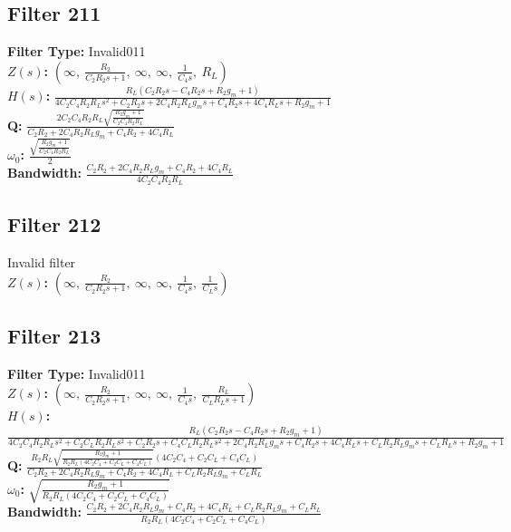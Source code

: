 \documentclass{article}
\begin{document}
\subsection*{Filter 211}
\textbf{Filter Type:} Invalid011 \\ 
\textbf{$Z(s)$:} $\left( \infty, \  \frac{R_{2}}{C_{2} R_{2} s + 1}, \  \infty, \  \infty, \  \frac{1}{C_{4} s}, \  R_{L}\right)$ \\ 
\textbf{$H(s)$:} $\frac{R_{L} \left(C_{2} R_{2} s - C_{4} R_{2} s + R_{2} g_{m} + 1\right)}{4 C_{2} C_{4} R_{2} R_{L} s^{2} + C_{2} R_{2} s + 2 C_{4} R_{2} R_{L} g_{m} s + C_{4} R_{2} s + 4 C_{4} R_{L} s + R_{2} g_{m} + 1}$ \\ 
\textbf{Q:} $\frac{2 C_{2} C_{4} R_{2} R_{L} \sqrt{\frac{R_{2} g_{m} + 1}{C_{2} C_{4} R_{2} R_{L}}}}{C_{2} R_{2} + 2 C_{4} R_{2} R_{L} g_{m} + C_{4} R_{2} + 4 C_{4} R_{L}}$ \\ 
\textbf{$\omega_0$:} $\frac{\sqrt{\frac{R_{2} g_{m} + 1}{C_{2} C_{4} R_{2} R_{L}}}}{2}$ \\ 
\textbf{Bandwidth:} $\frac{C_{2} R_{2} + 2 C_{4} R_{2} R_{L} g_{m} + C_{4} R_{2} + 4 C_{4} R_{L}}{4 C_{2} C_{4} R_{2} R_{L}}$ \\ 
\subsection*{Filter 212}
Invalid filter \\ 
\textbf{$Z(s)$:} $\left( \infty, \  \frac{R_{2}}{C_{2} R_{2} s + 1}, \  \infty, \  \infty, \  \frac{1}{C_{4} s}, \  \frac{1}{C_{L} s}\right)$ \\ 
\subsection*{Filter 213}
\textbf{Filter Type:} Invalid011 \\ 
\textbf{$Z(s)$:} $\left( \infty, \  \frac{R_{2}}{C_{2} R_{2} s + 1}, \  \infty, \  \infty, \  \frac{1}{C_{4} s}, \  \frac{R_{L}}{C_{L} R_{L} s + 1}\right)$ \\ 
\textbf{$H(s)$:} $\frac{R_{L} \left(C_{2} R_{2} s - C_{4} R_{2} s + R_{2} g_{m} + 1\right)}{4 C_{2} C_{4} R_{2} R_{L} s^{2} + C_{2} C_{L} R_{2} R_{L} s^{2} + C_{2} R_{2} s + C_{4} C_{L} R_{2} R_{L} s^{2} + 2 C_{4} R_{2} R_{L} g_{m} s + C_{4} R_{2} s + 4 C_{4} R_{L} s + C_{L} R_{2} R_{L} g_{m} s + C_{L} R_{L} s + R_{2} g_{m} + 1}$ \\ 
\textbf{Q:} $\frac{R_{2} R_{L} \sqrt{\frac{R_{2} g_{m} + 1}{R_{2} R_{L} \left(4 C_{2} C_{4} + C_{2} C_{L} + C_{4} C_{L}\right)}} \left(4 C_{2} C_{4} + C_{2} C_{L} + C_{4} C_{L}\right)}{C_{2} R_{2} + 2 C_{4} R_{2} R_{L} g_{m} + C_{4} R_{2} + 4 C_{4} R_{L} + C_{L} R_{2} R_{L} g_{m} + C_{L} R_{L}}$ \\ 
\textbf{$\omega_0$:} $\sqrt{\frac{R_{2} g_{m} + 1}{R_{2} R_{L} \left(4 C_{2} C_{4} + C_{2} C_{L} + C_{4} C_{L}\right)}}$ \\ 
\textbf{Bandwidth:} $\frac{C_{2} R_{2} + 2 C_{4} R_{2} R_{L} g_{m} + C_{4} R_{2} + 4 C_{4} R_{L} + C_{L} R_{2} R_{L} g_{m} + C_{L} R_{L}}{R_{2} R_{L} \left(4 C_{2} C_{4} + C_{2} C_{L} + C_{4} C_{L}\right)}$ \\ 
\end{document}
